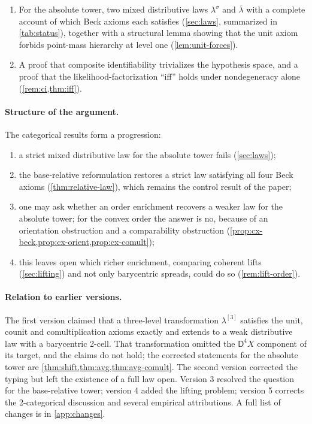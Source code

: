 \documentclass[11pt]{article}
\theoremstyle{definition}
\theoremstyle{remark}
\newcommand{\D}{\mathsf{D}}
\newcommand{\lb}{\bar\lambda}
\newcommand{\ls}{\lambda^{\sigma}}
\begin{document}
\begin{enumerate}[leftmargin=*]
  (\cref{sec:ident,sec:contam}); and their sequential form for generated tokens: a likelihood projection onto declared contexts with bands, an unknown certificate, and a level-two test of blending against switching (\cref{sec:seqattr}).
\item For the absolute tower, two mixed distributive laws $\ls$ and $\lb$ with a complete account
  of which Beck axioms each satisfies (\cref{sec:laws}, summarized in \cref{tab:status}), together with a structural lemma
  showing that the unit axiom forbids point-mass hierarchy at level one (\cref{lem:unit-forces}).
\item A proof that composite identifiability trivializes the hypothesis space, and a proof that the
  likelihood-factorization ``iff'' holds under nondegeneracy alone (\cref{rem:ci,thm:iff}).
\end{enumerate}

\paragraph{Structure of the argument.} The categorical results form a progression:
\begin{enumerate}[label=(\arabic*),leftmargin=*]
\item a strict mixed distributive law for the absolute tower fails (\cref{sec:laws});
\item the base-relative reformulation restores a strict law satisfying all four Beck axioms
  (\cref{thm:relative-law}), which remains the control result of the paper;
\item one may ask whether an order enrichment recovers a weaker law for the absolute tower; for the
  convex order the answer is no, because of an orientation obstruction and a comparability
  obstruction (\cref{prop:cx-beck,prop:cx-orient,prop:cx-comult});
\item this leaves open which richer enrichment, comparing coherent lifts (\cref{sec:lifting}) and not
  only barycentric spreads, could do so (\cref{rem:lift-order}).
\end{enumerate}

\paragraph{Relation to earlier versions.} The first version claimed that a three-level
transformation $\lambda^{[3]}$ satisfies the unit, counit and comultiplication axioms exactly and
extends to a weak distributive law with a barycentric 2-cell. That transformation omitted the
$\D^4X$ component of its target, and the claims do not hold; the corrected statements for the
absolute tower are \cref{thm:shift,thm:avg,thm:avg-comult}. The second version corrected the typing
but left the existence of a full law open. Version 3 resolved the question for the base-relative
tower; version 4 added the lifting problem; version 5 corrects the 2-categorical discussion and
several empirical attributions. A full list of changes is in \cref{app:changes}.
\end{document}
